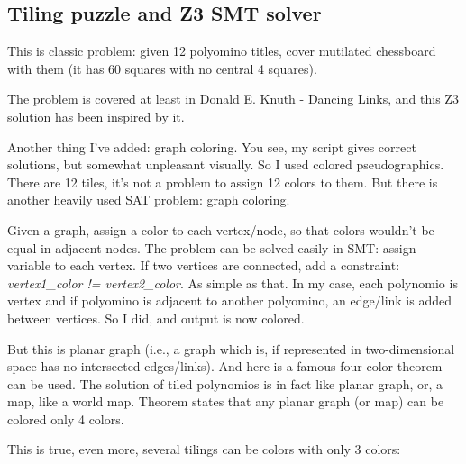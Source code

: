 \subsection{Tiling puzzle and Z3 SMT solver}

This is classic problem: given 12 polyomino titles, cover mutilated chessboard with them (it has 60 squares with no central 4 squares).

The problem is covered at least in \href{https://arxiv.org/pdf/cs/0011047.pdf}{Donald E. Knuth - Dancing Links},
and this Z3 solution has been inspired by it.

Another thing I've added: graph coloring. You see, my script gives correct solutions, but somewhat unpleasant visually.
So I used colored pseudographics. There are 12 tiles, it's not a problem to assign 12 colors to them.
But there is another heavily used SAT problem: graph coloring.

Given a graph, assign a color to each vertex/node, so that colors wouldn't be equal in adjacent nodes.
The problem can be solved easily in SMT: assign variable to each vertex.
If two vertices are connected, add a constraint: \textit{vertex1\_color != vertex2\_color}.
As simple as that.
In my case, each polynomio is vertex and if polyomino is adjacent to another polyomino, an edge/link is added between vertices.
So I did, and output is now colored.

But this is planar graph (i.e., a graph which is, if represented in two-dimensional space has no intersected edges/links).
And here is a famous four color theorem can be used.
The solution of tiled polynomios is in fact like planar graph, or, a map, like a world map.
Theorem states that any planar graph (or map) can be colored only 4 colors.

This is true, even more, several tilings can be colors with only 3 colors:

